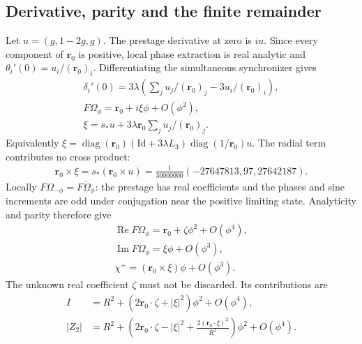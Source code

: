\subsection{Derivative, parity and the finite remainder}\label{sec:capacityderivative}
Let $u=(g,1-2g,g)$. The prestage derivative at zero is $iu$. Since every component of $\mathbf r_0$ is positive, local phase extraction is real analytic and $\theta_i'(0)=u_i/(\mathbf r_0)_i$. Differentiating the simultaneous synchronizer gives
\begin{equation}\label{eq:a47}%
\begin{gathered}
\delta_i'(0)=3\lambda\left(\sum_j u_j/(\mathbf r_0)_j-3u_i/(\mathbf r_0)_i\right),\\ F\Omega_\phi=\mathbf r_0+i\xi\phi+O(\phi^2),\\ \xi=s_*u+3\lambda \mathbf r_0\sum_j u_j/(\mathbf r_0)_j .
\end{gathered}
\end{equation}
Equivalently $\xi=\operatorname{diag}(\mathbf r_0)(\mathrm{Id}+3\lambda L_3)\operatorname{diag}(1/\mathbf r_0)u$. The radial term contributes no cross product:
\begin{equation}\label{eq:a48}%
\begin{gathered}
\mathbf r_0\times \xi=s_*(\mathbf r_0\times u)
=\frac1{30000000}(-27647813,97,27642187).
\end{gathered}
\end{equation}
Locally $F\Omega_{-\phi}=\overline{F\Omega_\phi}$: the prestage has real coefficients and the phases and sine increments are odd under conjugation near the positive limiting state. Analyticity and parity therefore give
\begin{equation}\label{eq:a49}%
\begin{gathered}
\operatorname{Re}F\Omega_\phi=\mathbf r_0+\zeta\phi^2+O(\phi^4),\\ \operatorname{Im}F\Omega_\phi=\xi\phi+O(\phi^3),\\ \chi^+=(\mathbf r_0\times \xi)\phi+O(\phi^3).
\end{gathered}
\end{equation}
The unknown real coefficient $\zeta$ must not be discarded. Its contributions are
\begin{equation}\label{eq:a50}%
\begin{aligned}
I&=R^2+(2\mathbf r_0\cdot \zeta+|\xi|^2)\phi^2+O(\phi^4),\\
|Z_2|&=R^2+
\left(2\mathbf r_0\cdot \zeta-|\xi|^2+\frac{2(\mathbf r_0\cdot \xi)^2}{R^2}\right)\phi^2+O(\phi^4).
\end{aligned}
\end{equation}
